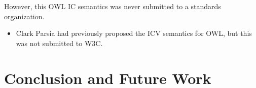 \documentclass{llncs}
\begin{document}
However, this OWL IC semantics was never submitted to a standards organization.

\begin{itemize}
	\item Clark Parsia had previously proposed the ICV semantics for OWL, but this was not submitted to W3C.
\end{itemize}

\section{Conclusion and Future Work}

{}

\setcounter{tocdepth}{1}
\end{document}
